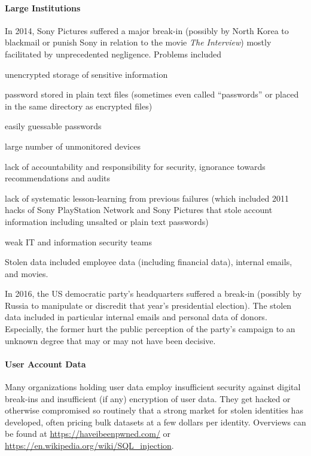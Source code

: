 \paragraph{Large Institutions}
In 2014, Sony Pictures suffered a major break-in (possibly by North Korea to blackmail or punish Sony in relation to the movie \emph{The Interview}) mostly facilitated by unprecedented negligence.
Problems included
\begin{compactitem}
 \item unencrypted storage of sensitive information
 \item password stored in plain text files (sometimes even called ``passwords'' or placed in the same directory as encrypted files)
 \item easily guessable passwords
 \item large number of unmonitored devices
 \item lack of accountability and responsibility for security, ignorance towards recommendations and audits
 \item lack of systematic lesson-learning from previous failures (which included 2011 hacks of Sony PlayStation Network and Sony Pictures that stole account information including unsalted or plain text passwords)
 \item weak IT and information security teams
\end{compactitem}
Stolen data included employee data (including financial data), internal emails, and movies.
\medskip

In 2016, the US democratic party's headquarters suffered a break-in (possibly by Russia to manipulate or discredit that year's presidential election).
The stolen data included in particular internal emails and personal data of donors.
Especially, the former hurt the public perception of the party's campaign to an unknown degree that may or may not have been decisive.

\paragraph{User Account Data}
Many organizations holding user data employ insufficient security against digital break-ins and insufficient (if any) encryption of user data.
They get hacked or otherwise compromised so routinely that a strong market for stolen identities has developed, often pricing bulk datasets at a few dollars per identity.
Overviews can be found at \url{https://haveibeenpwned.com/} or \url{https://en.wikipedia.org/wiki/SQL_injection}.

